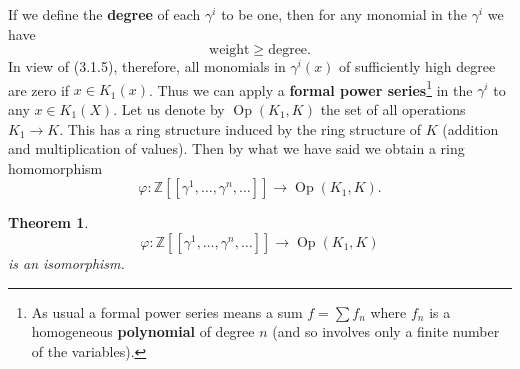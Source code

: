 \documentclass[leqno]{book}
\numberwithin{equation}{section}
\newtheorem{theorem}{Theorem}[section]%
\theoremstyle{definition}
\renewcommand{\emph}{\textbf}
\begin{document}
            If we define the \emph{degree} of each $\gamma^{i}$ to be one, then for any monomial in the $\gamma^{i}$ we have
            \begin{equation*}
              \text{weight}\ge \text{degree}.
            \end{equation*}
            In view of (3.1.5), therefore, all monomials in $\gamma^{i}(x)$ of sufficiently high degree are zero if $x\in K_1(x)$. Thus we can apply a \emph{formal power series}\footnote{As usual a formal power series means a sum $f=\sum f_{n}$ where $f_{n}$ is a homogeneous \emph{polynomial} of degree $n$ (and so involves only a finite number of the variables).} in the $\gamma^{i}$ to any $x\in K_1(X)$. Let us denote by $\operatorname{Op}(K_1,K)$ the set of all operations $K_1\to K$. This has a ring structure induced by the ring structure of $K$ (addition and multiplication of values). Then by what we have said we obtain a ring homomorphism
            \begin{equation*}
              \varphi:\mathbb{Z}[[\gamma^{1}, \ldots ,\gamma^{n}, \ldots ]]\to \operatorname{Op}(K_1,K).
            \end{equation*}

            \begin{theorem}
              \begin{equation*}
                \varphi:\mathbb{Z}[[\gamma^{1}, \ldots ,\gamma^{n}, \ldots ]]\to \operatorname{Op}(K_1,K)
              \end{equation*}
              is an isomorphism.
            \end{theorem}
\end{document}
